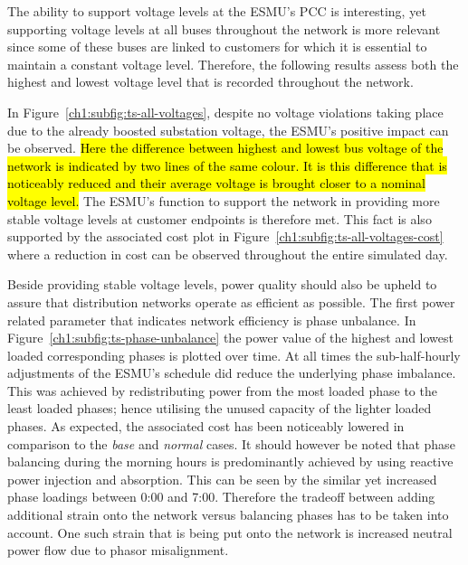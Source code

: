 The ability to support voltage levels at the ESMU's PCC is interesting, yet supporting voltage levels at all buses throughout the network is more relevant since some of these buses are linked to customers for which it is essential to maintain a constant voltage level.
Therefore, the following results assess both the highest and lowest voltage level that is recorded throughout the network.



In Figure~\ref{ch1:subfig:ts-all-voltages}, despite no voltage violations taking place due to the already boosted substation voltage, the ESMU's positive impact can be observed.
\hl{Here the difference between highest and lowest bus voltage of the network is indicated by two lines of the same colour.
It is this difference that is noticeably reduced and their average voltage is brought closer to a nominal voltage level.}
The ESMU's function to support the network in providing more stable voltage levels at customer endpoints is therefore met.
This fact is also supported by the associated cost plot in Figure~\ref{ch1:subfig:ts-all-voltages-cost} where a reduction in cost can be observed throughout the entire simulated day.



Beside providing stable voltage levels, power quality should also be upheld to assure that distribution networks operate as efficient as possible.
The first power related parameter that indicates network efficiency is phase unbalance.
In Figure~\ref{ch1:subfig:ts-phase-unbalance} the power value of the highest and lowest loaded corresponding phases is plotted over time.
At all times the sub-half-hourly adjustments of the ESMU's schedule did reduce the underlying phase imbalance.
This was achieved by redistributing power from the most loaded phase to the least loaded phases; hence utilising the unused capacity of the lighter loaded phases.
As expected, the associated cost has been noticeably lowered in comparison to the \textit{base} and \textit{normal} cases.
It should however be noted that phase balancing during the morning hours is predominantly achieved by using reactive power injection and absorption.
This can be seen by the similar yet increased phase loadings between 0:00 and 7:00.
Therefore the tradeoff between adding additional strain onto the network versus balancing phases has to be taken into account.
One such strain that is being put onto the network is increased neutral power flow due to phasor misalignment.

